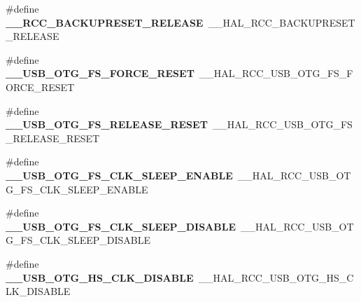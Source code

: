 \begin{DoxyCompactItemize}
\item 
\#define {\bfseries \+\_\+\+\_\+\+R\+C\+C\+\_\+\+B\+A\+C\+K\+U\+P\+R\+E\+S\+E\+T\+\_\+\+R\+E\+L\+E\+A\+SE}~\+\_\+\+\_\+\+H\+A\+L\+\_\+\+R\+C\+C\+\_\+\+B\+A\+C\+K\+U\+P\+R\+E\+S\+E\+T\+\_\+\+R\+E\+L\+E\+A\+SE\hypertarget{group___h_a_l___r_c_c___aliased_ga16e2165e9541a9ffbf34614eb6ef91c2}{}\label{group___h_a_l___r_c_c___aliased_ga16e2165e9541a9ffbf34614eb6ef91c2}

\item 
\#define {\bfseries \+\_\+\+\_\+\+U\+S\+B\+\_\+\+O\+T\+G\+\_\+\+F\+S\+\_\+\+F\+O\+R\+C\+E\+\_\+\+R\+E\+S\+ET}~\+\_\+\+\_\+\+H\+A\+L\+\_\+\+R\+C\+C\+\_\+\+U\+S\+B\+\_\+\+O\+T\+G\+\_\+\+F\+S\+\_\+\+F\+O\+R\+C\+E\+\_\+\+R\+E\+S\+ET\hypertarget{group___h_a_l___r_c_c___aliased_ga4cbf3d0cd9c1f29b7f38cd672a7f81a3}{}\label{group___h_a_l___r_c_c___aliased_ga4cbf3d0cd9c1f29b7f38cd672a7f81a3}

\item 
\#define {\bfseries \+\_\+\+\_\+\+U\+S\+B\+\_\+\+O\+T\+G\+\_\+\+F\+S\+\_\+\+R\+E\+L\+E\+A\+S\+E\+\_\+\+R\+E\+S\+ET}~\+\_\+\+\_\+\+H\+A\+L\+\_\+\+R\+C\+C\+\_\+\+U\+S\+B\+\_\+\+O\+T\+G\+\_\+\+F\+S\+\_\+\+R\+E\+L\+E\+A\+S\+E\+\_\+\+R\+E\+S\+ET\hypertarget{group___h_a_l___r_c_c___aliased_ga0c1425084511fd2205b412ee47165041}{}\label{group___h_a_l___r_c_c___aliased_ga0c1425084511fd2205b412ee47165041}

\item 
\#define {\bfseries \+\_\+\+\_\+\+U\+S\+B\+\_\+\+O\+T\+G\+\_\+\+F\+S\+\_\+\+C\+L\+K\+\_\+\+S\+L\+E\+E\+P\+\_\+\+E\+N\+A\+B\+LE}~\+\_\+\+\_\+\+H\+A\+L\+\_\+\+R\+C\+C\+\_\+\+U\+S\+B\+\_\+\+O\+T\+G\+\_\+\+F\+S\+\_\+\+C\+L\+K\+\_\+\+S\+L\+E\+E\+P\+\_\+\+E\+N\+A\+B\+LE\hypertarget{group___h_a_l___r_c_c___aliased_ga86e49075f8526ea61ca22a6f83ca65d7}{}\label{group___h_a_l___r_c_c___aliased_ga86e49075f8526ea61ca22a6f83ca65d7}

\item 
\#define {\bfseries \+\_\+\+\_\+\+U\+S\+B\+\_\+\+O\+T\+G\+\_\+\+F\+S\+\_\+\+C\+L\+K\+\_\+\+S\+L\+E\+E\+P\+\_\+\+D\+I\+S\+A\+B\+LE}~\+\_\+\+\_\+\+H\+A\+L\+\_\+\+R\+C\+C\+\_\+\+U\+S\+B\+\_\+\+O\+T\+G\+\_\+\+F\+S\+\_\+\+C\+L\+K\+\_\+\+S\+L\+E\+E\+P\+\_\+\+D\+I\+S\+A\+B\+LE\hypertarget{group___h_a_l___r_c_c___aliased_ga5e698c23794023e6a3bc1d636f969d29}{}\label{group___h_a_l___r_c_c___aliased_ga5e698c23794023e6a3bc1d636f969d29}

\item 
\#define {\bfseries \+\_\+\+\_\+\+U\+S\+B\+\_\+\+O\+T\+G\+\_\+\+H\+S\+\_\+\+C\+L\+K\+\_\+\+D\+I\+S\+A\+B\+LE}~\+\_\+\+\_\+\+H\+A\+L\+\_\+\+R\+C\+C\+\_\+\+U\+S\+B\+\_\+\+O\+T\+G\+\_\+\+H\+S\+\_\+\+C\+L\+K\+\_\+\+D\+I\+S\+A\+B\+LE\hypertarget{group___h_a_l___r_c_c___aliased_gaa06ceafbbae0701ae30f4f2208063ab2}{}\label{group___h_a_l___r_c_c___aliased_gaa06ceafbbae0701ae30f4f2208063ab2}


\end{DoxyCompactItemize}
